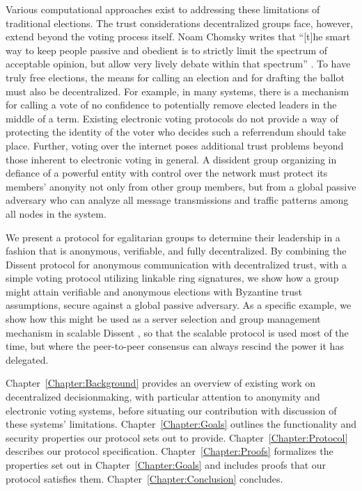 Various computational approaches exist to addressing these limitations of
traditional elections. The trust considerations decentralized groups face,
however, extend beyond the voting process itself. Noam Chomsky writes that
``[t]he smart way to keep people passive and obedient is to strictly limit the
spectrum of acceptable opinion, but allow very lively debate within that
spectrum'' \cite{chomsky1998common}. To have truly free elections, the means for
calling an election and for drafting the ballot must also be decentralized. For
example, in \tocite many systems, there is a mechanism for calling a vote of no
confidence to potentially remove elected
leaders in the middle of a term. Existing electronic voting protocols do not
provide a way of protecting the identity of the voter who decides such a
referrendum should take place. Further, voting over the internet poses
additional trust problems beyond those inherent to electronic voting in general.
A dissident group organizing in defiance of a powerful entity with control over
the network must protect its members' anonyity not only from other group
members, but from a global passive adversary who can analyze all message
transmissions and traffic patterns among all nodes in the system.

We present a protocol for egalitarian groups to determine their leadership in a
fashion that is anonymous, verifiable, and fully decentralized.  By combining
the Dissent protocol for anonymous communication with decentralized
trust\cite{p2pd}, with a simple voting protocol utilizing linkable ring
signatures\cite{lrs}, we show how a group might attain verifiable and anonymous
elections with Byzantine trust assumptions, secure against a global passive
adversary.  As a specific example, we show how this might be used as a server
selection and group management mechanism in scalable Dissent \cite{din}, so that
the scalable protocol is used most of the time, but where the peer-to-peer
consensus can always rescind the power it has delegated.

Chapter~\ref{Chapter:Background} provides an overview of existing work on
decentralized decisionmaking, with particular attention to anonymity and
electronic voting systems, before situating our contribution with discussion of
these systems' limitations. Chapter~\ref{Chapter:Goals} outlines the
functionality and security properties our protocol sets out to provide.
Chapter~\ref{Chapter:Protocol} describes our protocol specification.
Chapter~\ref{Chapter:Proofs} formalizes the properties set out in
Chapter~\ref{Chapter:Goals} and includes proofs that our protocol
satisfies them. Chapter~\ref{Chapter:Conclusion} concludes.
